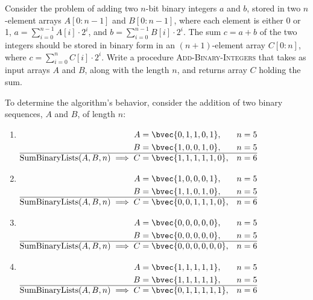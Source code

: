 \item[\textbf{Exercise 2.1-5}]
Consider the problem of adding two $n$-bit binary integers $a$ and $b$, stored
in two $n$-element arrays $A[0 : n - 1]$ and $B[0 : n - 1]$, where each element
is either 0 or 1, $a = \sum_{i=0}^{n-1} A[i] \cdot 2^i$, and $b =
\sum_{i=0}^{n-1} B[i] \cdot 2^i$. The sum $c = a + b$ of the two integers should
be stored in binary form in an $(n + 1)$-element array $C[0 : n]$, where $c =
\sum_{i=0}^{n} C[i] \cdot 2^i$. Write a procedure \textsc{Add-Binary-Integers}
that takes as input arrays $A$ and $B$, along with the length $n$, and returns
array $C$ holding the sum.

\Solution

To determine the algorithm's behavior, consider the addition of two binary
sequences, $A$ and $B$, of length $n$:

\begin{enumerate}[
    style      = multiline,
    itemsep    = 2em,
]
    \item $
    \begin{aligned}[t]
        A &= \bvec{0, 1, 1, 0, 1}, & n &= 5 \\
        B &= \bvec{1, 0, 0, 1, 0}, & n &= 5 \\
        \hline
        \text{SumBinaryLists}(A, B, n) \implies C &= \bvec{1, 1, 1, 1, 1, 0}, & n &= 6
    \end{aligned}
    $

    \item $
    \begin{aligned}[t]
        A &= \bvec{1, 0, 0, 0, 1}, & n &= 5 \\
        B &= \bvec{1, 1, 0, 1, 0}, & n &= 5 \\
        \hline
        \text{SumBinaryLists}(A, B, n) \implies C &= \bvec{0, 0, 1, 1, 1, 0}, & n &= 6
    \end{aligned}
    $

    \item $
    \begin{aligned}[t]
        A &= \bvec{0, 0, 0, 0, 0}, & n &= 5 \\
        B &= \bvec{0, 0, 0, 0, 0}, & n &= 5 \\
        \hline
        \text{SumBinaryLists}(A, B, n) \implies C &= \bvec{0, 0, 0, 0, 0, 0}, & n &= 6
    \end{aligned}
    $

    \item $
    \begin{aligned}[t]
        A &= \bvec{1, 1, 1, 1, 1}, & n &= 5 \\
        B &= \bvec{1, 1, 1, 1, 1}, & n &= 5 \\
        \hline
        \text{SumBinaryLists}(A, B, n) \implies C &= \bvec{0, 1, 1, 1, 1, 1}, & n &= 6
    \end{aligned}
    $
\end{enumerate}

